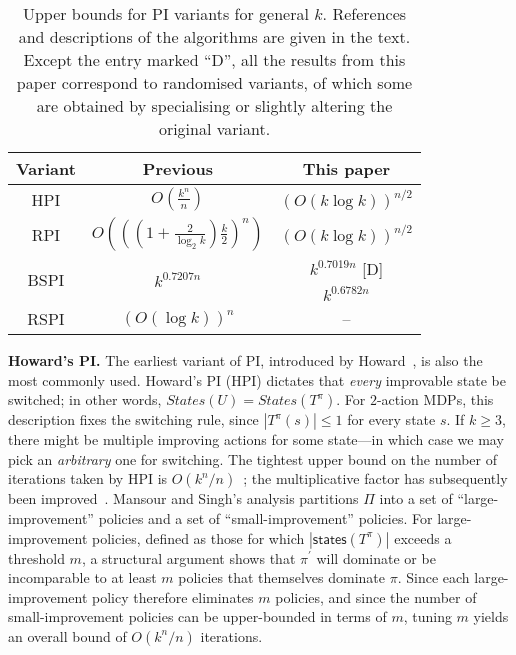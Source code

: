 \begin{table}[t]
\centering
\caption{Upper bounds for PI variants for general $k$. References and descriptions of the algorithms are given in the text. Except the entry marked ``D'', all the results from this paper correspond to randomised variants, of which some are obtained by specialising or slightly altering the original variant.}
\label{tab:summaryofbounds}
\begin{tabular}{c|c|c}
\textbf{Variant} & \textbf{Previous} & \textbf{This paper}\\\hline
HPI &  $O(\frac{k^{n}}{n})$ & $(O(k \log k))^{n / 2}$\\\hline
RPI & $O(((1 + \frac{2}{\log_{2} k})\frac{k}{2})^{n})$ & $(O(k \log k))^{n / 2}$\\\hline
\multirow{2}{*}{BSPI}  & \multirow{2}{*}{$k^{0.7207n}$} & $k^{0.7019n}$ [D]\\
 &  & $k^{0.6782n}$\\\hline
RSPI & $(O(\log k))^{n}$ & --\\ \hline
\end{tabular}
\end{table}


\noindent\textbf{Howard's PI.} The earliest variant of PI, introduced by Howard~, is also the most commonly used. Howard's PI (HPI) dictates that \textit{every} improvable state be switched; in other words, $\textit{States}(U) = \textit{States}(T^{\pi})$. For $2$-action MDPs, this description fixes the switching rule, since $|T^{\pi}(s)| \leq 1$ for every state $s$. If $k \geq 3$, there might be multiple improving actions for some state---in which case we may pick an \textit{arbitrary} one for switching. The tightest upper bound on the number of iterations taken by HPI is $O(k^{n}/n)$~\cite{Mansour+Singh:1999}; the multiplicative factor has subsequently been improved~\cite{Hollanders+GDJ:2014}. Mansour and Singh's analysis partitions $\Pi$ into a set of ``large-improvement'' policies and a set of ``small-improvement'' policies. For large-improvement policies, defined as those for which $|\textsf{states}(T^{\pi})|$ exceeds a threshold $m$, a structural argument shows that $\pi^{\prime}$ will dominate or be incomparable to at least $m$ policies that themselves dominate $\pi$. Since each large-improvement policy therefore eliminates $m$ policies, and since the number of small-improvement policies can be upper-bounded in terms of $m$, tuning $m$ yields an overall bound of $O(k^{n}/n)$ iterations.\\

